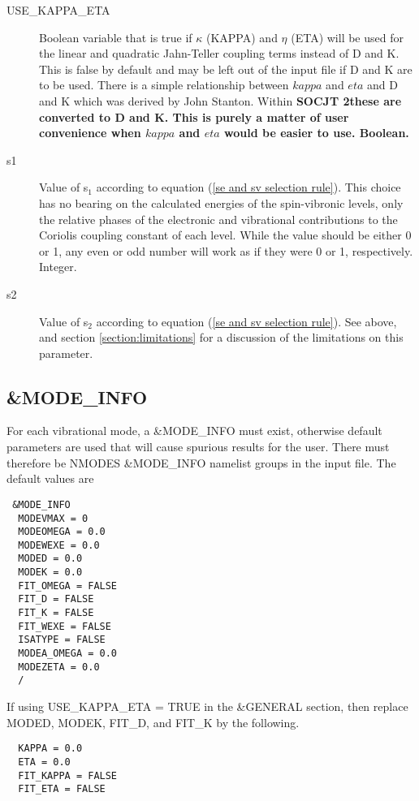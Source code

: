 \documentclass{article}
\newcommand{\socjttwo}{\bf{SOCJT 2}}
\begin{document}
\begin{description}
  \item[USE\_KAPPA\_ETA] Boolean variable that is true if $\kappa$ (KAPPA) and 
  $\eta$ (ETA) will be used for the linear and quadratic Jahn-Teller coupling
  terms instead of D and K. This is false by default and may be left out of the
  input file if D and K are to be used. There is a simple relationship between
  $kappa$ and $eta$ and D and K which was derived by John Stanton. Within
  \socjttwo these are converted to D and K. This is purely a matter of user convenience
  when $kappa$ and $eta$ would be easier to use. Boolean.

\item[s1] Value of s$_1$ according to equation (\ref{se and sv
    selection rule}). This choice has no bearing on the calculated
  energies of the spin-vibronic levels, only the relative phases of
  the electronic and vibrational contributions to the Coriolis
  coupling constant of each level. While the value should be either 0
  or 1, any even or odd number will work as if they were 0 or 1,
  respectively. Integer. 

\item[s2] Value of s$_2$ according to equation (\ref{se and sv
    selection rule}). See above, and section \ref{section:limitations}
  for a discussion of the limitations on this parameter.

\end{description}

\subsection{\&MODE\_INFO}

For each vibrational mode, a \&MODE\_INFO must exist, otherwise
default parameters are used that will cause spurious results for the
user. There must therefore be NMODES \&MODE\_INFO namelist groups in
the input file. The default values are

\begin{verbatim}
 &MODE_INFO
  MODEVMAX = 0
  MODEOMEGA = 0.0
  MODEWEXE = 0.0
  MODED = 0.0
  MODEK = 0.0
  FIT_OMEGA = FALSE
  FIT_D = FALSE
  FIT_K = FALSE
  FIT_WEXE = FALSE
  ISATYPE = FALSE
  MODEA_OMEGA = 0.0
  MODEZETA = 0.0
  /
\end{verbatim}

If using USE\_KAPPA\_ETA = TRUE in the \&GENERAL section, then replace MODED, MODEK, FIT\_D, and FIT\_K by the following.

\begin{verbatim}
  KAPPA = 0.0
  ETA = 0.0
  FIT_KAPPA = FALSE
  FIT_ETA = FALSE
\end{verbatim}
\end{document}
